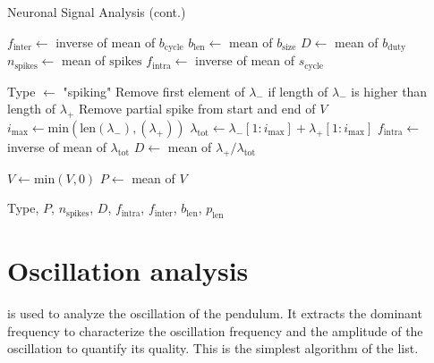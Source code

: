 \addtocounter{algorithm}{-1}
\begin{algorithm}[!t]
    \caption{Neuronal Signal Analysis (cont.)}
    \begin{algorithmic}[1]                  %
                    
                \EndFor
                
                \State $f_\text{inter} \gets$ inverse of mean of $b_\text{cycle}$
                \State $b_\text{len} \gets$ mean of $b_\text{size}$
                \State $D \gets$ mean of $b_\text{duty}$
                \State $n_\text{spikes} \gets$ mean of $\text{spikes}$
                \State $f_\text{intra} \gets$ inverse of mean of $s_\text{cycle}$
                
            \Else {}
                \State Type $\gets$ "spiking"
                \State Remove first element of $\lambda_-$ if length of $\lambda_-$ is higher than length of $\lambda_+$
                \State Remove partial spike from start and end of $V$
                \State $i_\text{max} \gets \text{min}\left(\text{len}\left(\lambda_-\right),\left(\lambda_+\right)\right)$ 
                \State $\lambda_\text{tot} \gets \lambda_-\left[1:i_\text{max}\right] + \lambda_+\left[1:i_\text{max}\right]$
                \State $f_\text{intra} \gets$ inverse of mean of $\lambda_\text{tot}$
                \State $D \gets$ mean of $\lambda_+/\lambda_\text{tot}$
            \EndIf
            
        \EndIf
        
        \State $V \gets \text{min}\left(V,0\right)$
        \State $P \gets$ mean of $V$
        
        \State \Return Type, $P$, $n_\text{spikes}$, $D$, $f_\text{intra}$, $f_\text{inter}$, $b_\text{len}$, $p_\text{len}$
    \end{algorithmic} 
\end{algorithm}   

\section{Oscillation analysis}

 is used to analyze the oscillation of the pendulum.
It extracts the dominant frequency to characterize the oscillation frequency and the amplitude of the oscillation to quantify its quality.
This is the simplest algorithm of the list.

